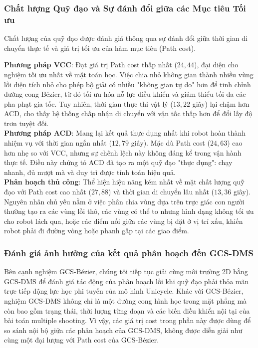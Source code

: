 \subsubsection*{Chất lượng Quỹ đạo và Sự đánh đổi giữa các Mục tiêu Tối ưu}

Chất lượng của quỹ đạo được đánh giá thông qua sự đánh đổi giữa thời gian di chuyển thực tế và giá trị tối ưu của hàm mục tiêu (Path cost).

\textbf{Phương pháp VCC}: Đạt giá trị Path cost thấp nhất ($24,44$), đại diện cho nghiệm tối ưu nhất về mặt toán học. Việc chia nhỏ không gian thành nhiều vùng lồi diện tích nhỏ cho phép bộ giải có nhiều "không gian tự do" hơn để tinh chỉnh đường cong Bézier, từ đó tối ưu hóa nỗ lực điều khiển và giảm thiểu tối đa các pha phạt gia tốc. Tuy nhiên, thời gian thực thi vật lý ($13,22$ giây) lại chậm hơn ACD, cho thấy hệ thống chấp nhận di chuyển với vận tốc thấp hơn để đổi lấy độ trơn tuyệt đối. \\
\textbf{Phương pháp ACD}: Mang lại kết quả thực dụng nhất khi robot hoàn thành nhiệm vụ với thời gian ngắn nhất ($12,79$ giây). Mặc dù Path cost ($24,63$) cao hơn nhẹ so với VCC, nhưng sự chênh lệch này không đáng kể trong vận hành thực tế. Điều này chứng tỏ ACD đã tạo ra một quỹ đạo "thực dụng": chạy nhanh, đủ mượt mà và duy trì được tính toán hiệu quả. \\
\textbf{Phân hoạch thủ công}: Thể hiện hiệu năng kém nhất về mặt chất lượng quỹ đạo với Path cost cao nhất ($27,88$) và thời gian di chuyển lâu nhất ($13,36$ giây). Nguyên nhân chủ yếu nằm ở việc phân chia vùng dựa trên trực giác con người thường tạo ra các vùng lồi thô, các vùng có thể to nhưng hình dạng không tối ưu cho robot lách qua, hoặc các điểm nối giữa các vùng bị đặt ở vị trí xấu, khiến robot phải đi đường vòng hoặc phanh gấp tại các giao điểm.


\subsubsection{Đánh giá ảnh hưởng của kết quả phân hoạch đến GCS-DMS}

Bên cạnh nghiệm GCS-Bézier, chúng tôi tiếp tục giải cùng môi trường 2D bằng GCS-DMS để đánh giá tác động của phân hoạch lồi khi quỹ đạo phải thỏa mãn trực tiếp động lực học phi tuyến của mô hình Unicycle. Khác với GCS-Bézier, nghiệm GCS-DMS không chỉ là một đường cong hình học trong mặt phẳng mà còn bao gồm trạng thái, thời lượng từng đoạn và các biến điều khiển nội tại của bài toán multiple shooting. Vì vậy, các giá trị cost trong phần này được dùng để so sánh nội bộ giữa các phân hoạch của GCS-DMS, không được diễn giải như cùng một đại lượng với Path cost của GCS-Bézier.

